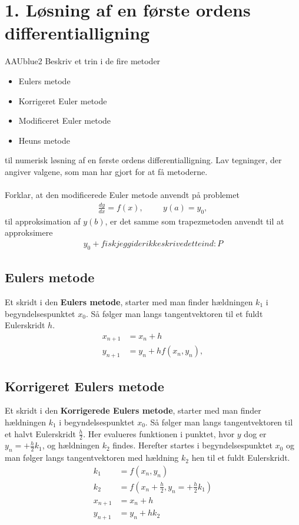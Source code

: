 \section*{1. Løsning af en første ordens differentialligning}
% 
%
\begin{color}{AAUblue2}
%
Beskriv et trin i de fire metoder 
% 
\begin{itemize}
\item Eulers metode 
\item Korrigeret Euler metode 
\item Modificeret Euler metode 
\item Heuns metode 
\end{itemize}
% 
til numerisk løsning af en første ordens differentialligning. 
Lav tegninger, der angiver valgene, som man har gjort for at få metoderne.  
\\\\
Forklar, at den modificerede Euler metode anvendt på problemet 
%
\begin{align*}
\frac{dy}{dx} = f(x), \phantom{heeej} y(a)= y_0,
\end{align*}
% 
til approksimation af $y(b)$, er det samme som trapezmetoden anvendt til at approksimere 
%
\begin{align*}
y_0 + fisk jeg gider ikke skrive dette ind :P
\end{align*}
% 
\end{color}
% 
% 
%
\subsection*{Eulers metode}
Et skridt i den \textbf{Eulers metode}, starter med man finder hældningen $k_1$ i begyndelsespunktet $x_0$.
Så følger man langs tangentvektoren til et fuldt Eulerskridt $h$.
%
\begin{align*}
x_{n+1} & = x_n+h \\
y_{n+1} & = y_n + h f(x_n,y_n),
\end{align*}
%

%
\subsection*{Korrigeret Eulers metode}
Et skridt i den \textbf{Korrigerede Eulers metode}, starter med man finder hældningen $k_1$ i begyndelsespunktet $x_0$.
Så følger man langs tangentvektoren til et halvt Eulerskridt $\frac{h}{2}$.
Her evalueres funktionen i punktet, hvor $y$ dog er $ y_n = + \frac{h}{2} k_1$,
og hældningen $k_2$ findes.
Herefter startes i begyndelsespunktet $x_0$ og man følger langs tangentvektoren med hældning $k_2$ hen til et fuldt Eulerskridt.
%
\begin{align*}
k_1 & = f(x_n , y_n) \\
k_2 & = f \left( x_n + \frac{h}{2} , y_n = + \frac{h}{2} k_1 \right)  \\
x_{n+1} & = x_n+h \\
y_{n+1} & = y_n + h k_2 
\end{align*}
%

%
